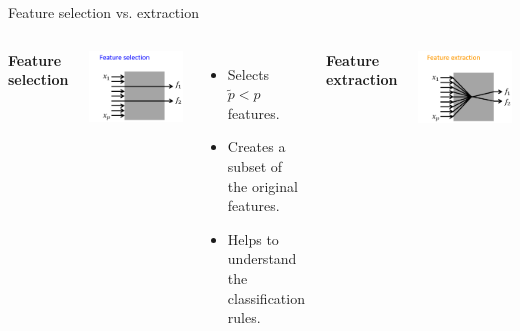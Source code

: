 \documentclass[11pt,compress,t,notes=noshow, xcolor=table]{beamer}
\begin{document}
  \begin{vbframe}{Feature selection vs. extraction}

    \begin{columns}

      \textbf{Feature selection}

      \medskip

      \includegraphics{figure_man/feature_selection.png}

      \smallskip

      \begin{itemize}
        \item Selects $\tilde{p} < p$ features.
        \item Creates a subset of the original features.
        \item Helps to understand the classification rules.
      \end{itemize}

      \textbf{Feature extraction}

      \medskip

      \includegraphics{figure_man/feature_extraction.png}


\end{columns}
\end{vbframe}
\end{document}
